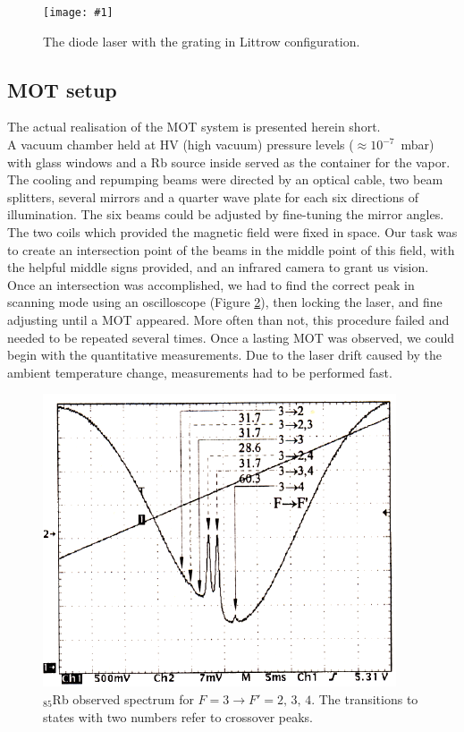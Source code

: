 \documentclass[twocolumn]{article}
\newcommand{\insertFigure}[1]{%
   \texttt{[image: \#1]}%
}
\begin{document}
\begin{figure} [!h]
	\centering
	\insertFigure{Images/Diode.png}
	\caption{The diode laser with the grating in Littrow configuration.\cite{manual}}
	\label{fig:Diode}
\end{figure}
\subsection{MOT setup}
The actual realisation of the MOT system is presented herein short.\\
A vacuum chamber held at HV (high vacuum) pressure levels ($\approx 10^{-7}$~mbar) with glass windows and a Rb source inside served as the container for the vapor. The cooling and repumping beams were directed by an optical cable, two beam splitters, several mirrors and a quarter wave plate for each six directions of illumination. The six beams could be adjusted by fine-tuning the mirror angles. The two coils which provided the magnetic field were fixed in space. Our task was to create an intersection point of the beams in the middle point of this field, with the helpful middle signs provided, and an infrared camera to grant us vision. Once an intersection was accomplished, we had to find the correct peak in scanning mode using an oscilloscope (Figure \ref{fig:Peaks}), then locking the laser, and fine adjusting until a MOT appeared. More often than not, this procedure failed and needed to be repeated several times. Once a lasting MOT was observed, we could begin with the quantitative measurements. Due to the laser drift caused by the ambient temperature change, measurements had to be performed fast.
\begin{figure}
	\centering
	\includegraphics[scale=0.5]{Images/Peaks.png}
	\caption{$_{85}$Rb observed spectrum for $F = 3 \rightarrow F' = 2, \, 3, \, 4$. The transitions to states with two numbers refer to crossover peaks.\cite{manual}}
	\label{fig:Peaks}
\end{figure}
\end{document}

